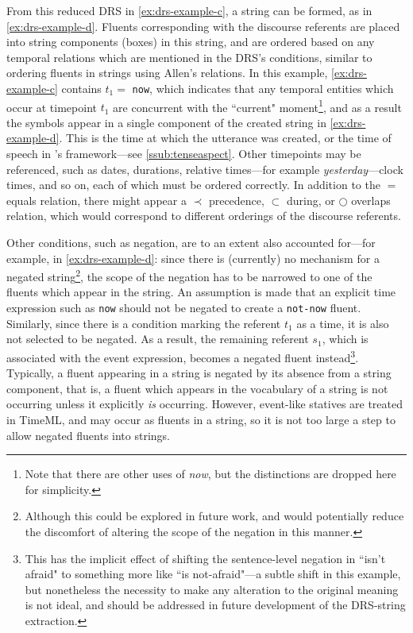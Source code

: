 \documentclass[a4paper,12pt,leqno,twoside]{article}
\begin{document}
From this reduced DRS in \cref{ex:drs-example-c}, a string can be formed, as in \cref{ex:drs-example-d}. Fluents corresponding with the discourse referents are placed into string components (boxes) in this string, and are ordered based on any temporal relations which are mentioned in the DRS's conditions, similar to ordering fluents in strings using Allen's relations. In this example, \cref{ex:drs-example-c} contains $t_1 =$ \texttt{now}, which indicates that any temporal entities which occur at timepoint $t_1$ are concurrent with the ``current" moment\footnote{Note that there are other uses of \textit{now}, but the distinctions are dropped here for simplicity.}, and as a result the symbols appear in a single component of the created string in \cref{ex:drs-example-d}. This is the time at which the utterance was created, or the time of speech in \citet{reichenbach1947elements}'s framework---see \cref{ssub:tenseaspect}. Other timepoints may be referenced, such as dates, durations, relative times---for example \textit{yesterday}---clock times, and so on, each of which must be ordered correctly. In addition to the $=$ equals relation, there might appear a $\prec$ precedence, $\subset$ during, or $\bigcirc$ overlaps relation, which would correspond to different orderings of the discourse referents.

Other conditions, such as negation, are to an extent also accounted for---for example, in \cref{ex:drs-example-d}: since there is (currently) no mechanism for a negated string\footnote{Although this could be explored in future work, and would potentially reduce the discomfort of altering the scope of the negation in this manner.}, the scope of the negation has to be narrowed to one of the fluents which appear in the string. %
An assumption is made that an explicit time expression such as \texttt{now} should not be negated to create a \texttt{not-now} fluent. Similarly, since there is a condition marking the referent $t_1$ as a time, it is also not selected to be negated. As a result, the remaining referent $s_1$, which is associated with the event expression, becomes a negated fluent instead\footnote{This has the implicit effect of shifting the sentence-level negation in ``isn't afraid" to something more like ``is not-afraid"---a subtle shift in this example, but nonetheless the necessity to make any alteration to the original meaning is not ideal, and should be addressed in future development of the DRS-string extraction.}. Typically, a fluent appearing in a string is negated by its absence from a string component, that is, a fluent which appears in the vocabulary of a string is not occurring unless it explicitly \textit{is} occurring. However, event-like statives are treated in TimeML, and may occur as fluents in a string, so it is not too large a step to allow negated fluents into strings.
\end{document}
